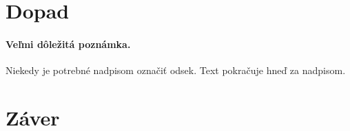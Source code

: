 \documentclass[10pt,twoside,slovak,a4paper]{article}
\begin{document}





\section{Dopad} \label{dopad}






\paragraph{Veľmi dôležitá poznámka.}
Niekedy je potrebné nadpisom označiť odsek. Text pokračuje hneď za nadpisom.

\section{Záver} \label{zaver} %






\end{document}
